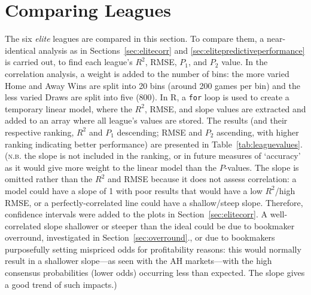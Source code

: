 \documentclass[a4paper,10pt]{report}
\begin{document}
\section{Comparing Leagues}\label{sec:elitecomparingleagues}
The six \textit{elite} leagues are compared in this section. To compare them, a near-identical analysis as in Sections~\ref{sec:elitecorr} and \ref{sec:elitepredictiveperformance} is carried out, to find each league's $R^2$, RMSE, $P_1$, and $P_2$ value. In the correlation analysis, a weight is added to the number of bins: the more varied Home and Away Wins are split into 20 bins (around 200 games per bin) and the less varied Draws are split into five (800). In R, a \lstinline|for| loop is used to create a temporary linear model, where the $R^2$, RMSE, and slope values are extracted and added to an array where all league's values are stored. The results (and their respective ranking, $R^2$ and $P_1$ descending; RMSE and $P_2$ ascending, with higher ranking indicating better performance) are presented in Table~\ref{tab:leaguevalues}. (\textsc{n.b.} the slope is not included in the ranking, or in future measures of `accuracy' as it would give more weight to the linear model than the $P$-values. The slope is omitted rather than the $R^2$ and RMSE because it does not assess correlation: a model could have a slope of 1 with poor results that would have a low $R^2$/high RMSE, or a perfectly-correlated line could have a shallow/steep slope. Therefore, confidence intervals were added to the plots in Section~\ref{sec:elitecorr}. A well-correlated slope shallower or steeper than the ideal could be due to bookmaker overround, investigated in Section~\ref{sec:overround}., or due to bookmakers purposefully setting mispriced odds for profitability reasons: this would normally result in a shallower slope---as seen with the AH markets---with the high consensus probabilities (lower odds) occurring less than expected. The slope gives a good trend of such impacts.)
 
\end{document}
